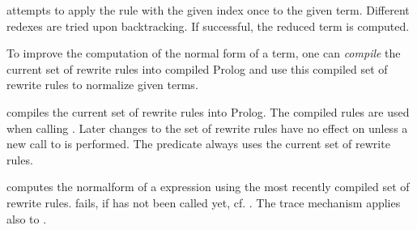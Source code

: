 \begin{command}
attempts to apply the rule with the given index once to the given term.
Different redexes are tried upon backtracking. If successful, the reduced
term is computed.
\end{command}

%
%
%
%
%
%
%
%
%
%
%
%
%
%
%
%
%
%
%

\noindent
To improve the computation of the normal form of a term, one can {\it compile}
the current set of rewrite rules into compiled Prolog and
use this compiled set of rewrite rules to normalize given terms.\bigskip

\begin{command}
compiles the current set of rewrite rules into  Prolog.
The compiled rules are used when calling . 
Later changes to the set of rewrite rules
have no effect on  unless a new call to  is
performed. The predicate  always uses the current set of
rewrite rules.
\end{command}

\begin{command}
computes the normalform of a expression using the most recently compiled set of rewrite
rules.  fails, if  has not been called yet, cf. .
The trace mechanism applies also to .
\end{command}

